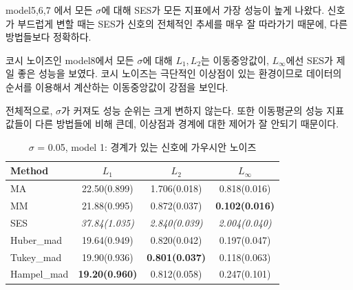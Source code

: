 \documentclass[letterpaper,12pt]{article}
\begin{document}
{model5,6,7 에서 모든 $\sigma$에 대해 SES가 모든 지표에서 가장 성능이 높게 나왔다. 신호가 부드럽게 변할 때는 SES가 신호의 전체적인 추세를 매우 잘 따라가기 때문에, 다른 방법들보다 정확하다.

코시 노이즈인  model8에서 모든 $\sigma$에 대해 $L_1,L_2$는 이동중앙값이, $L_\infty$에선 SES가 제일 좋은 성능을 보였다. 코시 노이즈는 극단적인 이상점이 있는 환경이므로 데이터의 순서를 이용해서 계산하는 이동중앙값이 강점을 보인다.


전체적으로, $\sigma$가 커져도 성능 순위는 크게 변하지 않는다. 또한 이동평균의 성능 지표값들이 다른 방법들에 비해 큰데, 이상점과 경계에 대한 제어가 잘 안되기 때문이다.


\begin{table}[H]
\small
\centering
\caption{$\sigma$ = 0.05, model 1: 경계가 있는 신호에 가우시안 노이즈}
\label{tab:s5w5m1}
\begin{tabular}{lccc}
\toprule
Method         & $L_1$             & $L_2$             & $L_\infty$         \\
\midrule
MA             & 22.50(0.899)          & 1.706(0.018)          & 0.818(0.016)           \\
MM             & 21.88(0.995)          & 0.872(0.037)          & \textbf{0.102(0.016)}  \\
SES            & \textit{37.84(1.035)} & \textit{2.840(0.039)} & \textit{2.004(0.040)}  \\
Huber\_mad     & 19.64(0.949)          & 0.820(0.042)          & 0.197(0.047)           \\
Tukey\_mad     & 19.90(0.936)          & \textbf{0.801(0.037)} & 0.118(0.063)           \\
Hampel\_mad    & \textbf{19.20(0.960)} & 0.812(0.058)          & 0.247(0.101)           \\
\bottomrule
\end{tabular}
\end{table}

}
\end{document}

